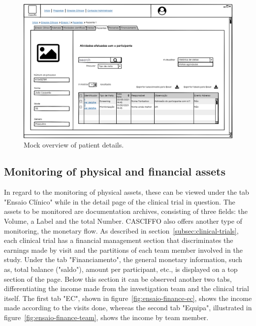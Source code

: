 \begin{figure}[H]
    \centering
    \includegraphics[scale=0.35]{images/ensaio-paciente-detalhes.png}
    \caption{Mock overview of patient details.}
    \label{fig:ensaio-paciente-detalhes}
\end{figure}

\subsection{Monitoring of physical and financial assets} 
In regard to the monitoring of physical assets, these can be viewed under the tab "Ensaio Clínico" while in the detail page of the clinical trial in question. The assets to be monitored are documentation archives, consisting of three fields: the Volume, a Label and the total Number.
CASCIFFO also offers another type of monitoring, the monetary flow. As described in section~\ref{subsec:clinical-trials}, each clinical trial has a financial management section that discriminates the earnings made by visit and the partitions of each team member involved in the study.  
Under the tab "Financiamento", the general monetary information, such as, total balance ("saldo"), amount per participant, etc., is displayed on a top section of the page. Below this section it can be observed another two tabs, differentiating the income made from the investigation team and the clinical trial itself. The first tab "EC", shown in figure~\ref{fig:ensaio-finance-ec}, shows the income made according to the visits done, whereas the second tab "Equipa", illustrated in figure~\ref{fig:ensaio-finance-team}, shows the income by team member.


